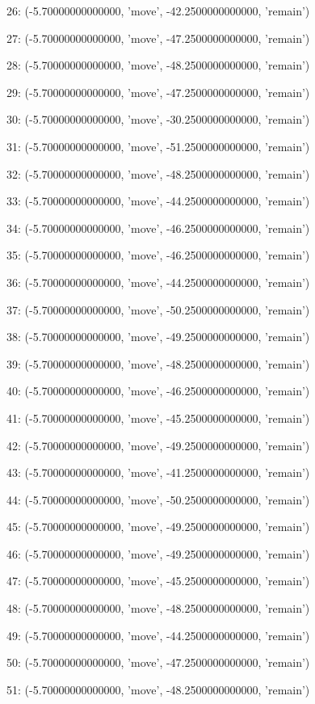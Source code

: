 26: (-5.70000000000000, 'move', -42.2500000000000, 'remain')


27: (-5.70000000000000, 'move', -47.2500000000000, 'remain')


28: (-5.70000000000000, 'move', -48.2500000000000, 'remain')


29: (-5.70000000000000, 'move', -47.2500000000000, 'remain')


30: (-5.70000000000000, 'move', -30.2500000000000, 'remain')


31: (-5.70000000000000, 'move', -51.2500000000000, 'remain')


32: (-5.70000000000000, 'move', -48.2500000000000, 'remain')


33: (-5.70000000000000, 'move', -44.2500000000000, 'remain')


34: (-5.70000000000000, 'move', -46.2500000000000, 'remain')


35: (-5.70000000000000, 'move', -46.2500000000000, 'remain')


36: (-5.70000000000000, 'move', -44.2500000000000, 'remain')


37: (-5.70000000000000, 'move', -50.2500000000000, 'remain')


38: (-5.70000000000000, 'move', -49.2500000000000, 'remain')


39: (-5.70000000000000, 'move', -48.2500000000000, 'remain')


40: (-5.70000000000000, 'move', -46.2500000000000, 'remain')


41: (-5.70000000000000, 'move', -45.2500000000000, 'remain')


42: (-5.70000000000000, 'move', -49.2500000000000, 'remain')


43: (-5.70000000000000, 'move', -41.2500000000000, 'remain')


44: (-5.70000000000000, 'move', -50.2500000000000, 'remain')


45: (-5.70000000000000, 'move', -49.2500000000000, 'remain')


46: (-5.70000000000000, 'move', -49.2500000000000, 'remain')


47: (-5.70000000000000, 'move', -45.2500000000000, 'remain')


48: (-5.70000000000000, 'move', -48.2500000000000, 'remain')


49: (-5.70000000000000, 'move', -44.2500000000000, 'remain')


50: (-5.70000000000000, 'move', -47.2500000000000, 'remain')


51: (-5.70000000000000, 'move', -48.2500000000000, 'remain')


